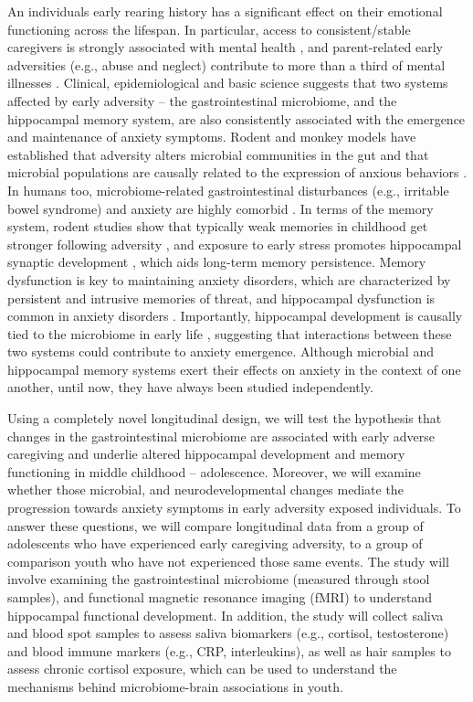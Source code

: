 \documentclass[
]{book}
\begin{document}
An individuals early rearing history has a significant effect on their emotional functioning across the lifespan. In particular, access to consistent/stable caregivers is strongly associated with mental health \citep{repetti_2002}, and parent-related early adversities (e.g., abuse and neglect) contribute to more than a third of mental illnesses \citep[anxiety being the most common diagnosis;][]{kessler_2005}. Clinical, epidemiological and basic science suggests that two systems affected by early adversity -- the gastrointestinal microbiome, and the hippocampal memory system, are also consistently associated with the emergence and maintenance of anxiety symptoms. Rodent and monkey models have established that adversity alters microbial communities in the gut \citep{bailey_1999, bailey_2010, omahony_2009} and that microbial populations are causally related to the expression of anxious behaviors \citep{collins_2013}. In humans too, microbiome-related gastrointestinal disturbances (e.g., irritable bowel syndrome) and anxiety are highly comorbid \citep{kennedy_2014, callaghan_2019}. In terms of the memory system, rodent studies show that typically weak memories in childhood get stronger following adversity \citetext{\citealp{callaghan_2012a}; \citealp[callaghan\_2012b;][]{cowan_2013}}, and exposure to early stress promotes hippocampal synaptic development \citep{huang_2005}, which aids long-term memory persistence. Memory dysfunction is key to maintaining anxiety disorders, which are characterized by persistent and intrusive memories of threat\citep{acheson_2012, zlomuzica_2014}, and hippocampal dysfunction is common in anxiety disorders \citep{godsil_2013}. Importantly, hippocampal development is causally tied to the microbiome in early life \citep{callaghan_2016, clarke_2013, cowan_2016, gareau_2011}, suggesting that interactions between these two systems could contribute to anxiety emergence. Although microbial and hippocampal memory systems exert their effects on anxiety in the context of one another, until now, they have always been studied independently.

Using a completely novel longitudinal design, we will test the hypothesis that changes in the gastrointestinal microbiome are associated with early adverse caregiving and underlie altered hippocampal development and memory functioning in middle childhood -- adolescence. Moreover, we will examine whether those microbial, and neurodevelopmental changes mediate the progression towards anxiety symptoms in early adversity exposed individuals. To answer these questions, we will compare longitudinal data from a group of adolescents who have experienced early caregiving adversity, to a group of comparison youth who have not experienced those same events. The study will involve examining the gastrointestinal microbiome (measured through stool samples), and functional magnetic resonance imaging (fMRI) to understand hippocampal functional development. In addition, the study will collect saliva and blood spot samples to assess saliva biomarkers (e.g., cortisol, testosterone) and blood immune markers (e.g., CRP, interleukins), as well as hair samples to assess chronic cortisol exposure, which can be used to understand the mechanisms behind microbiome-brain associations in youth.
\end{document}
